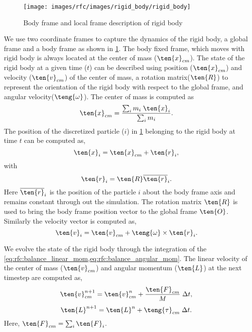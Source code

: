 \begin{figure}[!htpb]
  \centering
  \texttt{[image: images/rfc/images/rigid\_body/rigid\_body]}
  \caption{Body frame and local frame description of rigid body}
  \label{fig:gloabl_body_frame_rb}
\end{figure}
We use two coordinate frames to capture the dynamics of the rigid body, a
global frame and a body frame as shown in
\cref{fig:gloabl_body_frame_rb}. The body fixed frame, which moves with
rigid body is always located at the center of mass ($\ten{x}_{cm}$). The
state of the rigid body at a given time ($t$) can be described using position
($\ten{x}_{cm}$) and velocity ($\ten{v}_{cm}$) of the center of mass, a
rotation matrix($\ten{R}$) to represent the orientation of the rigid body with
respect to the global frame, and angular velocity($\teng{\omega}$). The center
of mass is computed as
\begin{equation}
  \label{eq:rfc:center_of_mass}
  \ten{x}_{cm} = \frac{\sum_i m_i \; \ten{x}_{i} }{\sum_i m_i }.
\end{equation}
The position of the discretized particle ($i$) in
\cref{fig:gloabl_body_frame_rb} belonging to the rigid body at time $t$ can be
computed as,
\begin{equation}
  \label{eq:rfc:rb_particle_pos_update}
  \ten{x}_i = \ten{x}_{cm} + \ten{r}_{i},
\end{equation}
with
\begin{equation}
  \label{eq:rfc:rb_particle_pos_update}
  \ten{r}_i = \ten{R} \overline{\ten{r}}_{i}.
\end{equation}
Here $\overline{\ten{r}}_{i}$ is the position of the particle $i$ about the body
frame axis and remains constant through out the simulation. The rotation matrix
$\ten{R}$ is used to bring the body frame position vector to the global frame
$\ten{O}$. Similarly the velocity vector is computed as,
\begin{equation}
  \label{eq:rfc:rb_particle_vel_update}
  \ten{v}_i = \ten{v}_{cm} + \teng{\omega} \times \ten{r}_{i}.
\end{equation}

We evolve the state of the rigid body through the integration of the
\cref{eq:rfc:balance_linear_mom,eq:rfc:balance_angular_mom}. The linear velocity of the
center of mass ($\ten{v}_{cm}$) and angular momentum ($\ten{L}$) at the next
timestep are computed as,
\begin{equation}
  \label{eq:rfc:lin_vel_cm_update}
  \ten{v}_{cm}^{n+1} = \ten{v}_{cm}^{n} + \frac{\ten{F}_{cm}}{M} \; \Delta t,
\end{equation}
\begin{equation}
  \label{eq:rfc:ang_mom_update}
  \ten{L}^{n+1} = \ten{L}^{n} + \teng{\tau}_{cm} \; \Delta t.
\end{equation}
Here, $\ten{F}_{cm} = \sum_i \ten{F}_i$.

